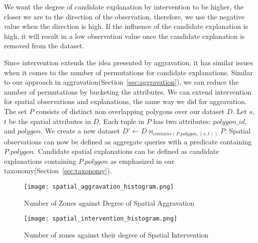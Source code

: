 We want the degree of candidate explanation by intervention to be higher, the closer we are to the direction of the observation, therefore, we use the negative value when the direction is high. If the influence of the candidate explanation is high, it will result in a low observation value once the candidate explanation is removed from the dataset.

Since intervention extends the idea presented by aggravation, it has similar issues when it comes to the number of permutations for candidate explanations. Similar to our approach in aggravation(Section~\ref{sec:aggravation}), we can reduce the number of permutations by bucketing the attributes. We can extend intervention for spatial observations and explanations, the same way we did for aggravation. The set $P$ consists of distinct non overlapping polygons over our dataset $D$. Let $s$,$t$ be the spatial attributes in $D$. Each tuple in $P$ has two attributes: $polygon\_id$, and $polygon$. We create a new dataset 
$D' \leftarrow D \bowtie_{contains(P.polygon,(s,t))} P$. Spatial observations can now be defined as aggregate queries with a predicate containing $P.polygon$. Candidate spatial explanations can be defined as candidate explanations containing $P.polygon$ as emphasized in our taxonomy(Section~\ref{sec:taxonomy}). 

\begin{figure}[ht]
\begin{center}
\texttt{[image: spatial\_aggravation\_histogram.png]}
\end{center}
\caption{Number of Zones against Degree of Spatial Aggravation}
\label{fig:spatial_aggravation_histogram}
\end{figure}

\begin{figure}[ht]
\begin{center}
\texttt{[image: spatial\_intervention\_histogram.png]}
\end{center}
\caption{Number of zones against their degree of Spatial Intervention}
\label{fig:spatial_intervention_histogram}
\end{figure}

